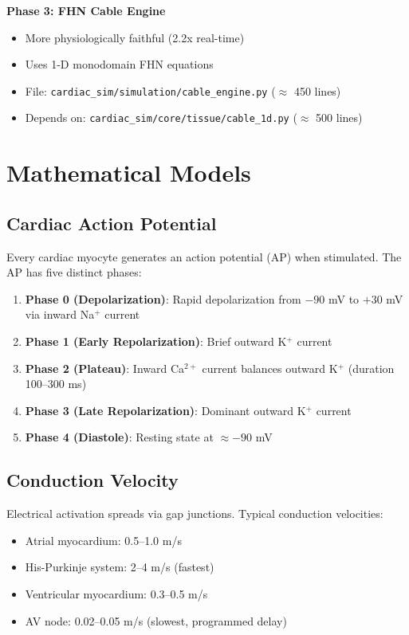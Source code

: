 \documentclass[12pt,a4paper]{article}
\begin{document}
\textbf{Phase 3: FHN Cable Engine}
\begin{itemize}
    \item More physiologically faithful (2.2x real-time)
    \item Uses 1-D monodomain FHN equations
    \item File: \texttt{cardiac\_sim/simulation/cable\_engine.py} ($\approx$ 450 lines)
    \item Depends on: \texttt{cardiac\_sim/core/tissue/cable\_1d.py} ($\approx$ 500 lines)
\end{itemize}

\section{Mathematical Models}

\subsection{Cardiac Action Potential}

Every cardiac myocyte generates an action potential (AP) when stimulated. The AP has five distinct phases:

\begin{enumerate}
    \item \textbf{Phase 0 (Depolarization)}: Rapid depolarization from $-90$ mV to $+30$ mV via inward Na$^+$ current
    \item \textbf{Phase 1 (Early Repolarization)}: Brief outward K$^+$ current
    \item \textbf{Phase 2 (Plateau)}: Inward Ca$^{2+}$ current balances outward K$^+$ (duration 100--300 ms)
    \item \textbf{Phase 3 (Late Repolarization)}: Dominant outward K$^+$ current
    \item \textbf{Phase 4 (Diastole)}: Resting state at $\approx -90$ mV
\end{enumerate}

\subsection{Conduction Velocity}

Electrical activation spreads via gap junctions. Typical conduction velocities:
\begin{itemize}
    \item Atrial myocardium: 0.5--1.0 m/s
    \item His-Purkinje system: 2--4 m/s (fastest)
    \item Ventricular myocardium: 0.3--0.5 m/s
    \item AV node: 0.02--0.05 m/s (slowest, programmed delay)
\end{itemize}
\end{document}
